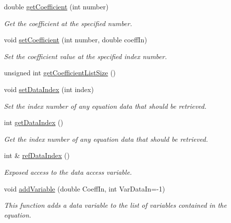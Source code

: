 \begin{DoxyCompactItemize}
double \hyperlink{classosea_1_1ofreq_1_1_equation_a6aa77458d50e80de2a31708756c7925b}{get\-Coefficient} (int number)
\begin{DoxyCompactList}\small\item\em Get the coefficient at the specified number. \end{DoxyCompactList}\item 
void \hyperlink{classosea_1_1ofreq_1_1_equation_a96dd6f24624703a1ff3ffb4d19a76582}{set\-Coefficient} (int number, double coeff\-In)
\begin{DoxyCompactList}\small\item\em Set the coefficient value at the specified index number. \end{DoxyCompactList}\item 
unsigned int \hyperlink{classosea_1_1ofreq_1_1_equation_aa3ceaac689d9cfef1a1b3123d8ec4027}{get\-Coefficient\-List\-Size} ()
\item 
void \hyperlink{classosea_1_1ofreq_1_1_equation_aa9e40c1cc6fb3cb030e9956663025a87}{set\-Data\-Index} (int index)
\begin{DoxyCompactList}\small\item\em Set the index number of any equation data that should be retrieved. \end{DoxyCompactList}\item 
int \hyperlink{classosea_1_1ofreq_1_1_equation_ac5fd13eba76ddbbf4813823fad4166e2}{get\-Data\-Index} ()
\begin{DoxyCompactList}\small\item\em Get the index number of any equation data that should be retrieved. \end{DoxyCompactList}\item 
int \& \hyperlink{classosea_1_1ofreq_1_1_equation_a5964477a42f3941a968f249b89742d73}{ref\-Data\-Index} ()
\begin{DoxyCompactList}\small\item\em Exposed access to the data access variable. \end{DoxyCompactList}\item 
void \hyperlink{classosea_1_1ofreq_1_1_equation_ade50004f0b16312e1c350be010a84440}{add\-Variable} (double Coeff\-In, int Var\-Data\-In=-\/1)
\begin{DoxyCompactList}\small\item\em This function adds a data variable to the list of variables contained in the equation. \end{DoxyCompactList}\end{DoxyCompactItemize}
